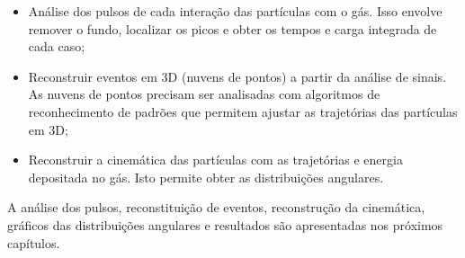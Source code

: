 \documentclass[a4paper,12pt,oneside]{book}
\begin{document}

\begin{itemize}
    \item Análise dos pulsos de cada interação das partículas com o gás. Isso envolve remover o fundo, localizar os picos e obter os tempos e carga integrada de cada caso;
    \item Reconstruir eventos em 3D (nuvens de pontos) a partir da análise de sinais. As nuvens de pontos precisam ser analisadas com algoritmos de reconhecimento de padrões que permitem ajustar as trajetórias das partículas em 3D;
    \item Reconstruir a cinemática das partículas com as trajetórias e energia depositada no gás. Isto permite obter as distribuições angulares. 
\end{itemize}


\par A análise dos pulsos, reconstituição de eventos, reconstrução da cinemática, gráficos das distribuições angulares e resultados são apresentadas nos próximos capítulos.

\end{document}
